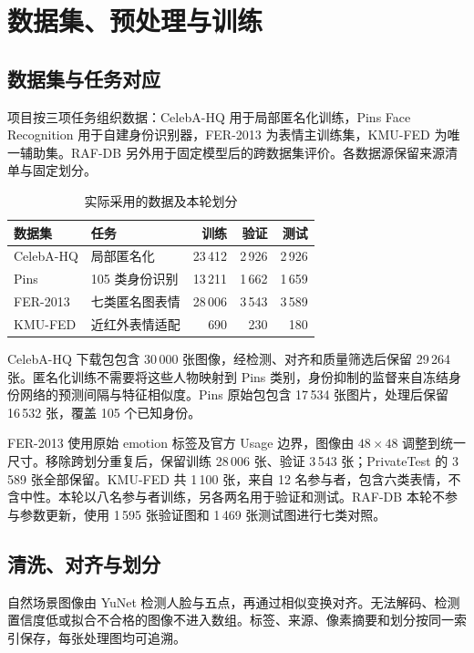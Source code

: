 \section{数据集、预处理与训练}
\label{sec:experiment}
\subsection{数据集与任务对应}
项目按三项任务组织数据：CelebA-HQ 用于局部匿名化训练，Pins Face Recognition 用于自建身份识别器，FER-2013 为表情主训练集，KMU-FED 为唯一辅助集。RAF-DB 另外用于固定模型后的跨数据集评价。各数据源保留来源清单与固定划分。

\begin{table}[htbp]
\centering
\caption{实际采用的数据及本轮划分}
\label{tab:datasets}
\begin{tabularx}{\linewidth}{@{}lXrrr@{}}
\toprule
数据集 & 任务 & 训练 & 验证 & 测试\\
\midrule
CelebA-HQ & 局部匿名化 & 23\,412 & 2\,926 & 2\,926\\
Pins & 105 类身份识别 & 13\,211 & 1\,662 & 1\,659\\
FER-2013 & 七类匿名图表情 & 28\,006 & 3\,543 & 3\,589\\
KMU-FED & 近红外表情适配 & 690 & 230 & 180\\
\bottomrule
\end{tabularx}
\end{table}

CelebA-HQ 下载包包含 30\,000 张图像，经检测、对齐和质量筛选后保留 29\,264 张。匿名化训练不需要将这些人物映射到 Pins 类别，身份抑制的监督来自冻结身份网络的预测间隔与特征相似度。Pins 原始包包含 17\,534 张图片，处理后保留 16\,532 张，覆盖 105 个已知身份。

FER-2013 使用原始 emotion 标签及官方 Usage 边界，图像由 $48\times48$ 调整到统一尺寸。移除跨划分重复后，保留训练 28\,006 张、验证 3\,543 张；PrivateTest 的 3\,589 张全部保留。KMU-FED 共 1\,100 张，来自 12 名参与者，包含六类表情，不含中性\cite{kmu2018}。本轮以八名参与者训练，另各两名用于验证和测试。RAF-DB 本轮不参与参数更新，使用 1\,595 张验证图和 1\,469 张测试图进行七类对照\cite{li2017rafdb}。

\subsection{清洗、对齐与划分}
自然场景图像由 YuNet 检测人脸与五点，再通过相似变换对齐。无法解码、检测置信度低或拟合不合格的图像不进入数组。标签、来源、像素摘要和划分按同一索引保存，每张处理图均可追溯。

